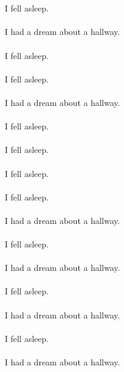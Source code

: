 \documentclass{article}
\begin{document}
    \section{}
    I fell asleep.\\\\I had a dream about a hallway.\\\\ I fell asleep.\\\\ I fell asleep.\\\\I had a dream about a hallway.\\\\ I fell asleep.\\\\ I fell asleep.\\\\ I fell asleep.\\\\ I fell asleep.\\\\I had a dream about a hallway.\\\\ I fell asleep.\\\\I had a dream about a hallway.\\\\ I fell asleep.\\\\I had a dream about a hallway.\\\\ I fell asleep.\\\\I had a dream about a hallway.\\\\ 
    \newpage
    
    
\end{document}
